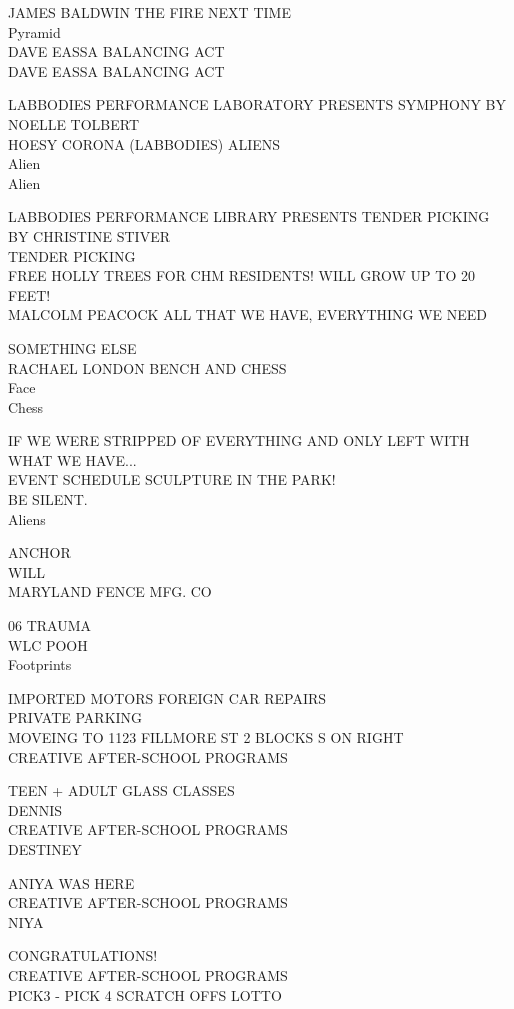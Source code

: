 \documentclass[10pt,letterpaper]{article}
\begin{document}
JAMES BALDWIN THE FIRE NEXT TIME\\
Pyramid\\
DAVE EASSA BALANCING ACT\\
DAVE EASSA BALANCING ACT

LABBODIES PERFORMANCE LABORATORY PRESENTS SYMPHONY BY NOELLE TOLBERT\\
HOESY CORONA (LABBODIES) ALIENS\\
Alien\\
Alien

LABBODIES PERFORMANCE LIBRARY PRESENTS TENDER PICKING BY CHRISTINE STIVER\\
TENDER PICKING\\
FREE HOLLY TREES FOR CHM RESIDENTS!  WILL GROW UP TO 20 FEET!\\
MALCOLM PEACOCK ALL THAT WE HAVE, EVERYTHING WE NEED

SOMETHING ELSE\\
RACHAEL LONDON BENCH AND CHESS\\
Face\\
Chess

IF WE WERE STRIPPED OF EVERYTHING AND ONLY LEFT WITH WHAT WE HAVE...\\
EVENT SCHEDULE SCULPTURE IN THE PARK!\\
BE SILENT.\\
Aliens

ANCHOR\\
WILL\\
MARYLAND FENCE MFG. CO

06 TRAUMA\\
WLC POOH\\
Footprints

IMPORTED MOTORS FOREIGN CAR REPAIRS\\
PRIVATE PARKING\\
MOVEING TO 1123 FILLMORE ST 2 BLOCKS S ON RIGHT\\
CREATIVE AFTER{-}SCHOOL PROGRAMS

TEEN + ADULT GLASS CLASSES\\
DENNIS\\
CREATIVE AFTER{-}SCHOOL PROGRAMS\\
DESTINEY

ANIYA WAS HERE\\
CREATIVE AFTER{-}SCHOOL PROGRAMS\\
NIYA

CONGRATULATIONS!\\
CREATIVE AFTER{-}SCHOOL PROGRAMS\\
PICK3 {-} PICK 4 SCRATCH OFFS LOTTO
\end{document}
